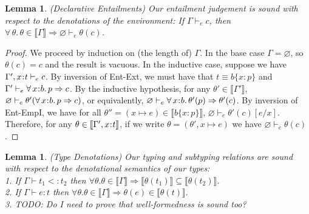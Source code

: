 \documentclass[11pt]{article}
\newtheorem{lemma}[theorem]{Lemma}
\newcommand{\bind}{\hspace{0.05em}{:}\hspace{0.05em}} %
\newcommand{\col}{\mathbin{:}}       %
\newcommand{\lb}{\llbracket}         %
\newcommand{\rb}{\rrbracket}         %
\begin{document}
\begin{lemma}{(Declarative Entailments) Our entailment judgement is sound with respect to the denotations of the environment: If
$\Gamma \vdash_e c$, then $\forall\, \theta.\, \theta \in \lb\Gamma\rb \Rightarrow \varnothing \vdash_e \theta(c)$.}
\label{decl-impl}
\end{lemma}

\begin{proof} %
We proceed by induction on (the length of) $\Gamma$. In the base case $\Gamma = \varnothing$, so $\theta(c) = c$ and the result is vacuous.
In the inductive case, suppose we have $\Gamma', x\bind t \vdash_e c$.
By inversion of {\sc Ent-Ext}, we must have that $t \equiv b\{x\col p\}$ and $\Gamma' \vdash_e \forall\,x\bind b.\, p \Rightarrow c$. By the inductive hypothesis, for any $\theta' \in \lb\Gamma'\rb$, $\varnothing \vdash_e \theta'(\forall\, x\bind b.\, p \Rightarrow c)$, or equivalently, $\varnothing \vdash_e \forall\, x\bind b.\, \theta'(p) \Rightarrow \theta'(c)$. By inversion of {\sc Ent-EmpI}, we have for all $\theta'' = (x\mapsto e) \in \lb b\{x\col p\}\rb$, $\varnothing \vdash_e \theta'(c)[e/x]$. Therefore, for any $\theta \in \lb \Gamma', x\bind t\rb$, if we write $\theta=(\theta', x\mapsto e)$ we have $\varnothing \vdash_e \theta(c)$.

\end{proof}

\begin{lemma}{(Type Denotations) Our typing and subtyping relations are sound with respect to the denotational semantics of our types:\\
1. If $\Gamma \vdash t_1 <: t_2$ then $\forall \theta. \theta \in \lb \Gamma \rb \Rightarrow \lb\theta(t_1)\rb \subseteq \lb\theta(t_2)\rb$.\\
2. If $\Gamma \vdash e : t$ then $\forall \theta. \theta \in \lb \Gamma \rb \Rightarrow \theta(e) \in \lb\theta(t)\rb.$
}\label{type-denote}\\
3. TODO: Do I need to prove that well-formedness is sound too?
\end{lemma}
\end{document}
